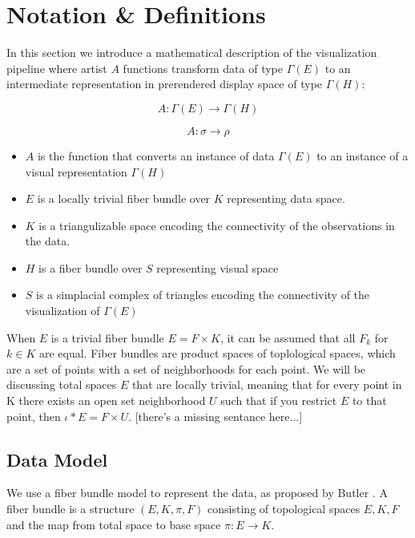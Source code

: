 \documentclass[../main.tex]{subfiles}
\begin{document}
\section{Notation \& Definitions}
In this section we introduce a mathematical description of the visualization pipeline where artist $A$ functions transform data of type $\Gamma(E)$ to an intermediate representation in prerendered display space of type $\Gamma(H)$:

\begin{equation}
    A: \Gamma(E) \rightarrow \Gamma(H)
    \label{eq:artist}
\end{equation}

\begin{equation}
    A: \sigma \rightarrow \rho
\end{equation}

\begin{itemize}
\item $A$ is the function that converts an instance of data $\Gamma(E)$ to an instance of a visual representation $\Gamma(H)$ 
\item $E$ is a locally trivial fiber bundle over $K$ representing data space.
\item $K$ is a triangulizable space encoding the connectivity of the observations in the data. 
\item $H$ is a fiber bundle over $S$ representing visual space
\item $S$ is a simplacial complex of triangles encoding the connectivity of the visualization of $\Gamma(E)$
\end{itemize}

When $E$ is a trivial fiber bundle $E = F \times K$, it can be assumed that all $F_{k}$ for $k \in K$ are equal. Fiber bundles are product spaces of toplological spaces, which are a set of points with a set of neighborhoods for each point\cite{some topology text book, really wikipedia}. We will be discussing total spaces $E$ that are locally trivial, meaning that for every point in K there exists an open set neighborhood $U$ such that if you restrict $E$ to that point, then  $\iota*E = F\times U$. [there's a missing sentance here...]


\subsection{Data Model}

We use a fiber bundle model to represent the data, as proposed by Butler 
\cite{butlerVectorBundleClassesForm1992,butlerVisualizationModelBased1989}. A fiber bundle is a structure $(E, K, \pi, F)$  consisting of topological spaces $E, K, F$ and the map from total space to base space $\pi: E \rightarrow K$. 
\end{document}
